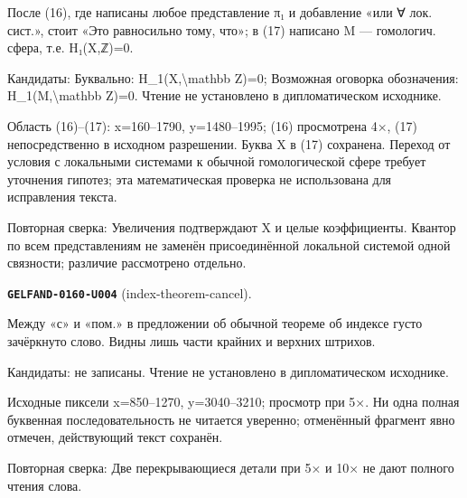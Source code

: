 После (16), где написаны любое представление π₁ и добавление «или ∀ лок. сист.», стоит «Это равносильно тому, что»; в (17) написано M — гомологич. сфера, т.е. H₁(X,ℤ)=0.\par
Кандидаты: Буквально: H\_1(X,\textbackslash{}mathbb Z)=0; Возможная оговорка обозначения: H\_1(M,\textbackslash{}mathbb Z)=0. Чтение не установлено в дипломатическом исходнике.\par
Область (16)–(17): x=160–1790, y=1480–1995; (16) просмотрена 4×, (17) непосредственно в исходном разрешении. Буква X в (17) сохранена. Переход от условия с локальными системами к обычной гомологической сфере требует уточнения гипотез; эта математическая проверка не использована для исправления текста.\par
Повторная сверка: Увеличения подтверждают X и целые коэффициенты. Квантор по всем представлениям не заменён присоединённой локальной системой одной связности; различие рассмотрено отдельно.\par\medskip
\par\noindent\leavevmode{}\label{GELFAND-0160-U004}\label{GELFAND-P001475:index-theorem-cancel}\textbf{\texttt{GELFAND-0160-U004}} (index-theorem-cancel).\nopagebreak[4]\par
Между «с» и «пом.» в предложении об обычной теореме об индексе густо зачёркнуто слово. Видны лишь части крайних и верхних штрихов.\par
Кандидаты: не записаны. Чтение не установлено в дипломатическом исходнике.\par
Исходные пиксели x=850–1270, y=3040–3210; просмотр при 5×. Ни одна полная буквенная последовательность не читается уверенно; отменённый фрагмент явно отмечен, действующий текст сохранён.\par
Повторная сверка: Две перекрывающиеся детали при 5× и 10× не дают полного чтения слова.\par\medskip
